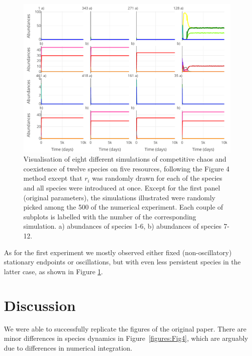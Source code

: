 \begin{figure}[H]
\begin{center} 
 \includegraphics[width=1\textwidth]{../Code/Figures/Figure_exp2.pdf}
  \caption{Visualisation of eight different simulations of competitive chaos and coexistence of twelve species on five resources, following the Figure 4 method except that $r_i$ was randomly drawn for each of the species and all species were introduced at once. Except for the first panel (original parameters), the simulations illustrated were randomly picked among the 500 of the numerical experiment. Each couple of subplots is labelled with the number of the corresponding simulation. a) abundances of species 1-6, b) abundances of species 7-12.}
  \label{figures:Figexp2}
\end{center}
\end{figure}

As for the first experiment we mostly observed either fixed (non-oscillatory) stationary endpoints or oscillations, but with even less persistent species in the latter case, as shown in Figure \ref{figures:Figexp2}. %

\section{Discussion}

We were able to successfully replicate the figures of the original paper. There are minor differences in species dynamics in Figure~\ref{figures:Fig4}, which are arguably due to differences in numerical integration.\\

